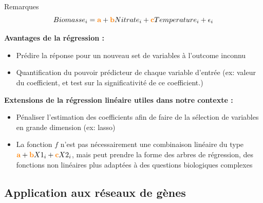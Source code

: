 	
	\begin{frame}{Remarques}
	\vspace{-0.8cm}
	\begin{equation*}
    	    Biomasse_i = \textcolor{orange}{\textbf{a}} + \textcolor{orange}{\textbf{b}}Nitrate_i +\textcolor{orange}{\textbf{c}}Temperature_i + \epsilon_i
    	\end{equation*}

    	\textbf{Avantages de la régression : }
    	
    	
    	\begin{itemize} \scriptsize
    	\item Prédire la réponse pour un nouveau set de variables à l'outcome inconnu
    	    \item Quantification du pouvoir prédicteur de chaque variable d'entrée (ex: valeur du coefficient, et test sur la significativité de ce coefficient.)
    	\end{itemize}
    	
    	
    	
    	\vspace{0.5cm}
    	
    	\textbf{Extensions de la régression linéaire utiles dans notre contexte : }
    	
    	
    	
    	\begin{itemize} \scriptsize
    	
    	\item Pénaliser l'estimation des coefficients afin de faire de la sélection de variables en grande dimension (ex: lasso)
    	
    	\item La fonction $f$ n'est pas nécessairement une combinaison linéaire du type $\textcolor{orange}{\textbf{a}} + \textcolor{orange}{\textbf{b}}X1_i + \textcolor{orange}{\textbf{c}}X2_i$, mais peut prendre la forme des arbres de régression, des fonctions non linéaires plus adaptées à des questions biologiques complexes

    	\end{itemize}
    	
    	
	\end{frame}

\subsection{Application aux réseaux de gènes}

